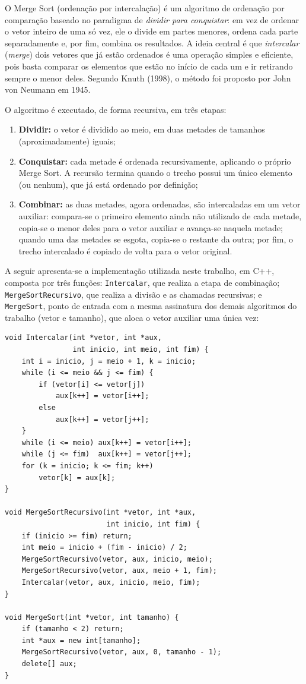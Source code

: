 \qquad O Merge Sort (ordenação por intercalação) é um algoritmo de
ordenação por comparação baseado no paradigma de \textit{dividir para
conquistar}: em vez de ordenar o vetor inteiro de uma só vez, ele o
divide em partes menores, ordena cada parte separadamente e, por fim,
combina os resultados. A ideia central é que \textit{intercalar}
(\textit{merge}) dois vetores que já estão ordenados é uma operação
simples e eficiente, pois basta comparar os elementos que estão no
início de cada um e ir retirando sempre o menor deles. Segundo Knuth
(1998), o método foi proposto por John von Neumann em 1945.

\qquad O algoritmo é executado, de forma recursiva, em três etapas:

\begin{enumerate}
    \item \textbf{Dividir:} o vetor é dividido ao meio, em duas metades
    de tamanhos (aproximadamente) iguais;
    \item \textbf{Conquistar:} cada metade é ordenada recursivamente,
    aplicando o próprio Merge Sort. A recursão termina quando o trecho
    possui um único elemento (ou nenhum), que já está ordenado por
    definição;
    \item \textbf{Combinar:} as duas metades, agora ordenadas, são
    intercaladas em um vetor auxiliar: compara-se o primeiro elemento
    ainda não utilizado de cada metade, copia-se o menor deles para o
    vetor auxiliar e avança-se naquela metade; quando uma das metades
    se esgota, copia-se o restante da outra; por fim, o trecho
    intercalado é copiado de volta para o vetor original.
\end{enumerate}

\qquad A seguir apresenta-se a implementação utilizada neste trabalho, em
C++, composta por três funções: \texttt{Intercalar}, que realiza a etapa
de combinação; \texttt{MergeSortRecursivo}, que realiza a divisão e as
chamadas recursivas; e \texttt{MergeSort}, ponto de entrada com a mesma
assinatura dos demais algoritmos do trabalho (vetor e tamanho), que
aloca o vetor auxiliar uma única vez:

\begin{verbatim}
void Intercalar(int *vetor, int *aux,
                int inicio, int meio, int fim) {
    int i = inicio, j = meio + 1, k = inicio;
    while (i <= meio && j <= fim) {
        if (vetor[i] <= vetor[j])
            aux[k++] = vetor[i++];
        else
            aux[k++] = vetor[j++];
    }
    while (i <= meio) aux[k++] = vetor[i++];
    while (j <= fim)  aux[k++] = vetor[j++];
    for (k = inicio; k <= fim; k++)
        vetor[k] = aux[k];
}

void MergeSortRecursivo(int *vetor, int *aux,
                        int inicio, int fim) {
    if (inicio >= fim) return;
    int meio = inicio + (fim - inicio) / 2;
    MergeSortRecursivo(vetor, aux, inicio, meio);
    MergeSortRecursivo(vetor, aux, meio + 1, fim);
    Intercalar(vetor, aux, inicio, meio, fim);
}

void MergeSort(int *vetor, int tamanho) {
    if (tamanho < 2) return;
    int *aux = new int[tamanho];
    MergeSortRecursivo(vetor, aux, 0, tamanho - 1);
    delete[] aux;
}
\end{verbatim}

